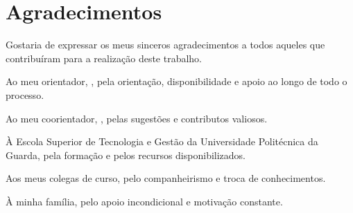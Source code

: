 %


\chapter*{Agradecimentos}


Gostaria de expressar os meus sinceros agradecimentos a todos aqueles que contribuíram para a realização deste trabalho.

Ao meu orientador, \nomeOrientador, pela orientação, disponibilidade e apoio ao longo de todo o processo.

Ao meu coorientador, \nomeCoorientador, pelas sugestões e contributos valiosos.

À Escola Superior de Tecnologia e Gestão da Universidade Politécnica da Guarda, pela formação e pelos recursos disponibilizados.

Aos meus colegas de curso, pelo companheirismo e troca de conhecimentos.

À minha família, pelo apoio incondicional e motivação constante.

\cleardoublepage
